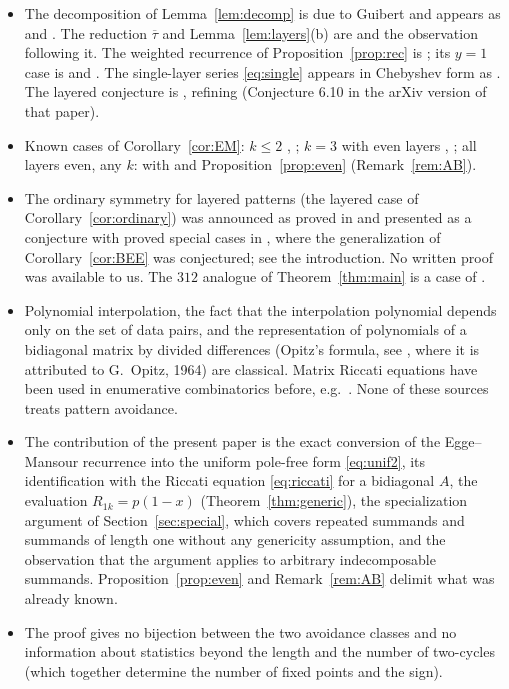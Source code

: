 \documentclass[11pt]{amsart}
\theoremstyle{definition}
\newcommand{\red}[1]{\overline{#1}}
\begin{document}
\begin{itemize}
\item The decomposition of Lemma~\ref{lem:decomp} is due to Guibert \cite{Guibert1995} and appears as \cite[Proposition 2.1]{EggeMansour2006} and \cite[Proposition 2.9]{Egge2004}. The reduction $\red\tau$ and Lemma~\ref{lem:layers}(b) are \cite[Definition 3.2]{EggeMansour2006} and the observation following it. The weighted recurrence of Proposition~\ref{prop:rec} is \cite[Theorem 3.3]{EggeMansour2006}; its $y=1$ case is \cite[Corollary 5.6]{Egge2004} and \cite[Eq.~(13)]{Egge2007}. The single-layer series \eqref{eq:single} appears in Chebyshev form as \cite[Theorem 3.8]{EggeMansour2006}. The layered conjecture is \cite[Conjecture 3.14]{EggeMansour2006}, refining \cite[Conjecture 6.9]{Egge2004} (Conjecture 6.10 in the arXiv version of that paper).
\item Known cases of Corollary~\ref{cor:EM}: $k\le2$ \cite[Theorem 6.7]{Egge2004}, \cite[Theorems 3.12--3.13]{EggeMansour2006}; $k=3$ with even layers \cite[Eq.~(44)]{Egge2004}, \cite[Eq.~(18)]{EggeMansour2006}; all layers even, any $k$: \cite{AlbertBouvel2015} with \cite[Theorem 3.3]{Egge2007} and Proposition~\ref{prop:even} (Remark~\ref{rem:AB}).
\item The ordinary symmetry for layered patterns (the layered case of Corollary~\ref{cor:ordinary}) was announced as proved in \cite{BursteinEgge2026} and presented as a conjecture with proved special cases in \cite{BursteinPP2026}, where the generalization of Corollary~\ref{cor:BEE} was conjectured; see the introduction. No written proof was available to us. The $312$ analogue of Theorem~\ref{thm:main} is a case of \cite[Definition 7 (3) and Theorem 8]{AlbertBouvel2015}.
\item Polynomial interpolation, the fact that the interpolation polynomial depends only on the set of data pairs, and the representation of polynomials of a bidiagonal matrix by divided differences (Opitz's formula, see \cite[\S4]{deBoor2005}, where it is attributed to G.~Opitz, 1964) are classical. Matrix Riccati equations have been used in enumerative combinatorics before, e.g.\ \cite{CGJN1981}. None of these sources treats pattern avoidance.
\item The contribution of the present paper is the exact conversion of the Egge--Mansour recurrence into the uniform pole-free form \eqref{eq:unif2}, its identification with the Riccati equation \eqref{eq:riccati} for a bidiagonal $A$, the evaluation $R_{1k}=p(1-x)$ (Theorem~\ref{thm:generic}), the specialization argument of Section~\ref{sec:special}, which covers repeated summands and summands of length one without any genericity assumption, and the observation that the argument applies to arbitrary indecomposable summands. Proposition~\ref{prop:even} and Remark~\ref{rem:AB} delimit what was already known.
\item The proof gives no bijection between the two avoidance classes and no information about statistics beyond the length and the number of two-cycles (which together determine the number of fixed points and the sign).
\end{itemize}
\end{document}
